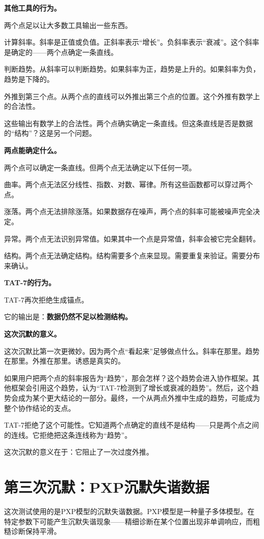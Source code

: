 \documentclass[11pt,a4paper]{book}
\theoremstyle{definition}
\begin{document}
\textbf{其他工具的行为。}

两个点足以让大多数工具输出一些东西。

计算斜率。斜率是正值或负值。正斜率表示“增长”。负斜率表示“衰减”。这个斜率是确定的——两个点确定一条直线。

判断趋势。从斜率可以判断趋势。如果斜率为正，趋势是上升的。如果斜率为负，趋势是下降的。

外推到第三个点。从两个点的直线可以外推出第三个点的位置。这个外推有数学上的合法性。

这些输出有数学上的合法性。两个点确实确定一条直线。但这条直线是否是数据的“结构”？这是另一个问题。

\textbf{两点能确定什么。}

两个点可以确定一条直线。但两个点无法确定以下任何一项。

曲率。两个点无法区分线性、指数、对数、幂律。所有这些函数都可以穿过两个点。

涨落。两个点无法排除涨落。如果数据存在噪声，两个点的斜率可能被噪声完全决定。

异常。两个点无法识别异常值。如果其中一个点是异常值，斜率会被它完全翻转。

结构。两个点无法确定结构。结构需要多个点来显现。需要重复来验证。需要分布来确认。

\textbf{TAT-7的行为。}

TAT-7再次拒绝生成锚点。

它的输出是：\textbf{数据仍然不足以检测结构。}

\textbf{这次沉默的意义。}

这次沉默比第一次更微妙。因为两个点“看起来”足够做点什么。斜率在那里。趋势在那里。外推在那里。诱惑是真实的。

如果用户把两个点的斜率报告为“趋势”，那会怎样？这个趋势会进入协作框架。其他框架会引用这个趋势，认为“TAT-7检测到了增长或衰减的趋势”。然后，这个趋势会成为某个更大结论的一部分。最终，一个从两点外推中生成的趋势，可能成为整个协作结论的支点。

TAT-7拒绝了这个可能性。它知道两个点确定的直线不是结构——只是两个点之间的连线。它拒绝把这条连线称为“趋势”。

这次沉默的意义在于：它阻止了一次过度外推。

\section{第三次沉默：PXP沉默失谐数据}

这次测试使用的是PXP模型的沉默失谐数据。PXP模型是一种量子多体模型。在特定参数下可能产生沉默失谐现象——精细诊断在某个位置出现非单调响应，而粗糙诊断保持平滑。
\end{document}
